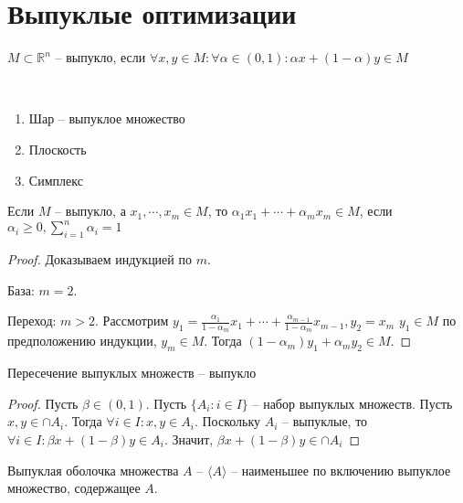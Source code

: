 \documentclass[document.tex]{subfiles}
\begin{document}
\section{Выпуклые оптимизации}
\begin{definition}
    $M \subset \mathbb{R}^n$ -- выпукло, если $\forall x, y \in M: \forall \alpha \in (0, 1): \alpha x + (1 - \alpha) y
    \in M$
\end{definition}

\begin{example}
    ~\begin{enumerate}
        \item Шар -- выпуклое множество
        \item Плоскость
        \item Симплекс
    \end{enumerate}
\end{example}

\begin{statement}
    Если $M$ -- выпукло, а $x_1, \cdots, x_m \in M$, то $\alpha_1 x_1 + \cdots + \alpha_m x_m \in M$, если $\alpha_i
    \geq 0, \sum_{i = 1}^n \alpha_i = 1$
\end{statement}

\begin{proof}
    Доказываем индукцией по $m$.

    База: $m = 2$.

    Переход: $m > 2$.
    Рассмотрим $y_1 =\frac{\alpha_1}{1 - \alpha_m} x_1 + \cdots + \frac{\alpha_{m - 1}}{1 - \alpha_m} x_{m - 1}, y_2 = x_m$
    $y_1 \in M$ по предположению индукции, $y_m \in M$. Тогда $(1 - \alpha_m)y_1 + \alpha_m y_2 \in M$.
\end{proof}

\begin{statement}
    Пересечение выпуклых множеств -- выпукло
\end{statement}

\begin{proof}
    Пусть $\beta \in (0, 1)$. Пусть $\{A_i : i \in I\}$ -- набор выпуклых множеств. Пусть $x, y \in \cap A_i$. Тогда
    $\forall i \in I: x, y \in A_i$. Поскольку $A_i$ -- выпуклые, то $\forall i \in I: \beta x + (1 - \beta) y \in A_i$.
    Значит, $\beta x + (1 - \beta) y \in \cap A_i$
\end{proof}

\begin{definition}
    Выпуклая оболочка множества $A$ -- $\langle A \rangle$ -- наименьшее по включению выпуклое множество, содержащее $A$.
\end{definition}
\end{document}
